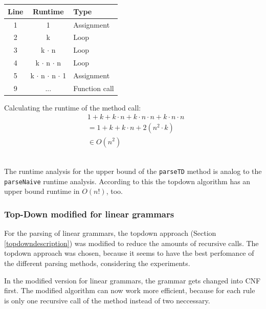 \documentclass[a4paper, 11pt]{article}
\begin{document}
\ \\ \\
\begin{minipage}{0.5\textwidth}

\begin{tabular}{|c|c|l|}
\hline
Line & Runtime & Type \\
\hline
1 &  1 & Assignment \\
2 & k & Loop \\
3 & k $\cdot$ n & Loop \\
4 & k $\cdot$ n $\cdot$ n &  Loop\\
5 & k $\cdot$ n $\cdot$ n $\cdot$ 1 & Assignment\\
9 & ... & Function call\\
\hline
\end{tabular}


\end{minipage}\begin{minipage}{0.5\textwidth}
Calculating the runtime of the method call:
\begin{align*}
& 1 + k + k \cdot n + k \cdot n \cdot n + k \cdot n \cdot n \\
& = 1 + k + k \cdot n + 2(n^2 \cdot k) \\
& \in O(n^2)
\end{align*}
\end{minipage}
\ \\

The runtime analysis for the upper bound of the \texttt{parseTD} method is analog to the \texttt{parseNaive} runtime analysis. According to this the topdown algorithm has an upper bound runtime in $O(n!)$, too.



\subsubsection{Top-Down modified for linear grammars}
\label{lineartopdown}

For the parsing of linear grammars, the topdown approach (Section \ref{topdowndescription}) was modified to reduce the amounts of recursive calls. The topdown approach was chosen, because it seems to have the best perfomance of the different parsing methods, considering the experiments.

In the modified version for linear grammars, the grammar gets changed into CNF first. The modified algorithm can now work more efficient, because for each rule is only one recursive call of the method instead of two neccessary.
\end{document}
